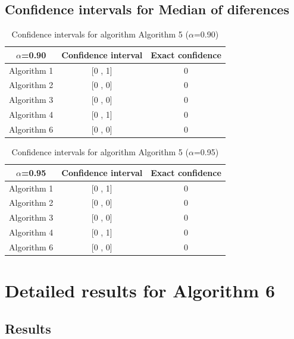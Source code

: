 \documentclass[a4paper,10pt]{article}
\begin{document}
\subsection{Confidence intervals for Median of diferences}

\begin{table}[!htp]
\centering\small
\begin{tabular}{
|c|c|c|}
\hline
 $\alpha$=0.90 & Confidence interval & Exact confidence \\ \hline 
Algorithm 1 & [0 , 1] & 0\\ \hline 
Algorithm 2 & [0 , 0] & 0\\ \hline 
Algorithm 3 & [0 , 0] & 0\\ \hline 
Algorithm 4 & [0 , 1] & 0\\ \hline 
Algorithm 6 & [0 , 0] & 0\\ \hline 

\end{tabular}
\caption{Confidence intervals for algorithm Algorithm 5 ($\alpha$=0.90)}
\end{table}
\begin{table}[!htp]
\centering\small
\begin{tabular}{
|c|c|c|}
\hline
 $\alpha$=0.95 & Confidence interval & Exact confidence \\ \hline 
Algorithm 1 & [0 , 1] & 0\\ \hline 
Algorithm 2 & [0 , 0] & 0\\ \hline 
Algorithm 3 & [0 , 0] & 0\\ \hline 
Algorithm 4 & [0 , 1] & 0\\ \hline 
Algorithm 6 & [0 , 0] & 0\\ \hline 

\end{tabular}
\caption{Confidence intervals for algorithm Algorithm 5 ($\alpha$=0.95)}
\end{table}

 \clearpage 


\section{Detailed results for Algorithm 6}


\subsection{Results}
\end{document}
